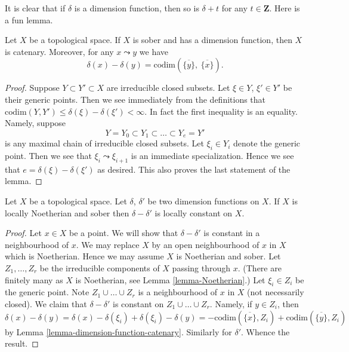 \noindent
It is clear that if $\delta$ is a dimension function, then so is
$\delta + t$ for any $t \in \mathbf{Z}$. Here is a fun lemma.

\begin{lemma}
\label{lemma-dimension-function-catenary}
Let $X$ be a topological space. If $X$ is sober and has a dimension
function, then $X$ is catenary. Moreover, for any $x \leadsto y$
we have
$$
\delta(x) - \delta(y) =
\text{codim}\left(\overline{\{y\}}, \ \overline{\{x\}}\right).
$$
\end{lemma}

\begin{proof}
Suppose $Y \subset Y' \subset X$ are irreducible closed subsets.
Let $\xi \in Y$, $\xi' \in Y'$ be their generic points.
Then we see immediately from the definitions that
$\text{codim}(Y, Y') \leq \delta(\xi) - \delta(\xi') < \infty$.
In fact the first inequality is an equality. Namely, suppose
$$
Y = Y_0 \subset Y_1 \subset \ldots \subset Y_e = Y'
$$
is any maximal chain of irreducible closed subsets. Let
$\xi_i \in Y_i$ denote the generic point. Then we see that
$\xi_i \leadsto \xi_{i + 1}$ is an immediate specialization.
Hence we see that $e = \delta(\xi) - \delta(\xi')$ as desired.
This also proves the last statement of the lemma.
\end{proof}

\begin{lemma}
\label{lemma-dimension-function-unique}
Let $X$ be a topological space.
Let $\delta$, $\delta'$ be two dimension functions on $X$.
If $X$ is locally Noetherian and sober then $\delta - \delta'$ is
locally constant on $X$.
\end{lemma}

\begin{proof}
Let $x \in X$ be a point. We will show that $\delta - \delta'$ is
constant in a neighbourhood of $x$.
We may replace $X$ by an open neighbourhood
of $x$ in $X$ which is Noetherian. Hence we may assume $X$ is
Noetherian and sober.
Let $Z_1, \ldots, Z_r$ be the irreducible
components of $X$ passing through $x$. (There are finitely many as
$X$ is Noetherian, see Lemma \ref{lemma-Noetherian}.)
Let $\xi_i \in Z_i$ be the generic point.
Note $Z_1 \cup \ldots \cup Z_r$ is a neighbourhood of $x$ in $X$
(not necessarily closed). We claim that $\delta - \delta'$ is
constant on $Z_1 \cup \ldots \cup Z_r$. Namely, if $y \in Z_i$,
then
$$
\delta(x) - \delta(y) = \delta(x) - \delta(\xi_i) + \delta(\xi_i) - \delta(y)
= - \text{codim}(\overline{\{x\}}, Z_i)
+ \text{codim}(\overline{\{y\}}, Z_i)
$$
by Lemma \ref{lemma-dimension-function-catenary}.
Similarly for $\delta'$. Whence the result.
\end{proof}

